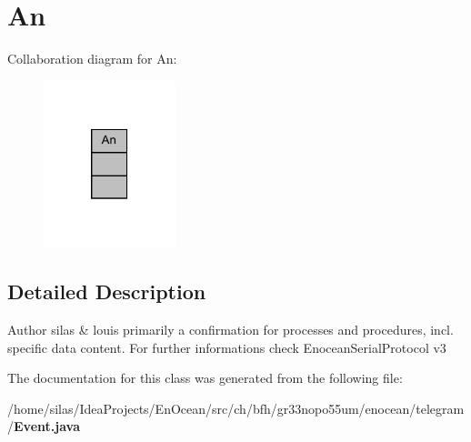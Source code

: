 \section{An}
\label{classAn}


Collaboration diagram for An\+:\nopagebreak
\begin{figure}[H]
\begin{center}
\leavevmode
\includegraphics[width=109pt]{d8/d66/classAn__coll__graph}
\end{center}
\end{figure}


\subsection{Detailed Description}
\begin{DoxyAuthor}{Author}
silas \& louis primarily a confirmation for processes and procedures, incl. specific data content. For further informations check Enocean\+Serial\+Protocol v3 
\end{DoxyAuthor}


The documentation for this class was generated from the following file\+:\begin{DoxyCompactItemize}
\item 
/home/silas/\+Idea\+Projects/\+En\+Ocean/src/ch/bfh/gr33nopo55um/enocean/telegram/{\bf Event.\+java}\end{DoxyCompactItemize}
